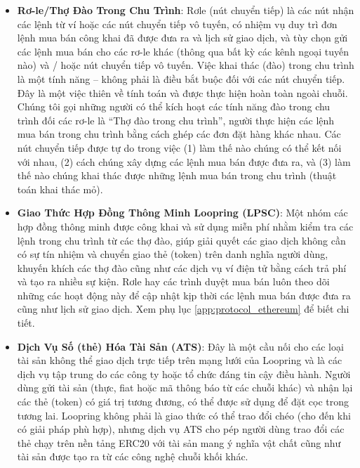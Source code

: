 \documentclass{article}
\begin{document}
\begin{multicols}{2}
\begin{itemize}
\item \textbf{Rơ-le/Thợ Đào Trong Chu Trình}: Rơle (nút chuyển tiếp) là các nút nhận các lệnh từ ví hoặc các nút chuyển tiếp vô tuyến, có nhiệm vụ duy trì đơn lệnh mua bán công khai đã được đưa ra và lịch sử giao dịch, và tùy chọn gửi các lệnh mua bán cho các rơ-le khác (thông qua bất kỳ các kênh ngoại tuyến nào) và / hoặc nút chuyển tiếp vô tuyến. Việc khai thác (đào) trong chu trình là một tính năng – không phải là điều bắt buộc đối với các nút chuyển tiếp. Đây là một việc thiên về tính toán và được thực hiện hoàn toàn ngoài chuỗi. Chúng tôi gọi những người có thể kích hoạt các tính năng đào trong chu trình đối các rơ-le là \enquote{Thợ đào trong chu trình}, người thực hiện các lệnh mua bán trong chu trình bằng cách ghép các đơn đặt hàng khác nhau. Các nút chuyển tiếp được tự do trong việc (1) làm thế nào chúng có thể kết nối với nhau, (2) cách chúng xây dựng các lệnh mua bán được đưa ra, và (3) làm thế nào chúng khai thác được những lệnh mua bán trong chu trình (thuật toán khai thác mỏ).

\item \textbf{Giao Thức Hợp Đồng Thông Minh Loopring (LPSC)}: Một nhóm các hợp đồng thông minh được công khai và sử dụng miễn phí nhằm kiểm tra các lệnh trong chu trình từ các thợ đào, giúp giải quyết các giao dịch không cần có sự tín nhiệm và chuyển giao thẻ (token) trên danh nghĩa người dùng, khuyến khích các thợ đào cũng như các dịch vụ ví điện tử bằng cách trả phí và tạo ra nhiều sự kiện. Rơle hay các trình duyệt mua bán luôn theo dõi những các hoạt động này để cập nhật kịp thời các lệnh mua bán được đưa ra cũng như lịch sử giao dịch. Xem phụ lục \ref{app:protocol_ethereum} để biết chi tiết.

\item \textbf{Dịch Vụ Số (thẻ) Hóa Tài Sản (ATS)}: Đây là một cầu nối cho các loại tài sản không thể giao dịch trực tiếp trên mạng lưới của Loopring và là các dịch vụ tập trung do các công ty hoặc tổ chức đáng tin cậy điều hành. Người dùng gửi tài sản (thực, fiat hoặc mã thông báo từ các chuỗi khác) và nhận lại các thẻ (token) có giá trị tương đương, có thể được sử dụng để đặt cọc trong tương lai. Loopring không phải là giao thức có thể trao đổi chéo (cho đến khi có giải pháp phù hợp), nhưng dịch vụ ATS cho pép người dùng trao đổi các thẻ chạy trên nền tảng ERC20 \cite{ERC20} với tài sản mang ý nghĩa vật chất cũng như tài sản được tạo ra từ các công nghệ chuỗi khối khác. 

\end{itemize}



\end{multicols}
\end{document}
